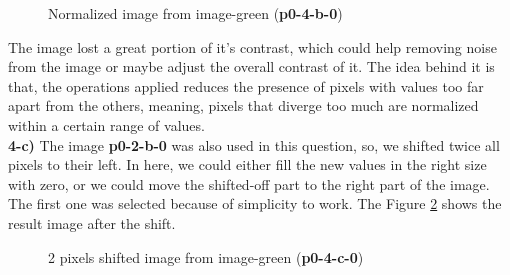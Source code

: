 \documentclass[12pt,a4paper]{article}
\begin{document}
\begin{figure}[!h]
	\centering
	{%
		\setlength{\fboxsep}{1pt}%
		\setlength{\fboxrule}{1pt}%
	}%
	\caption{Normalized image from image-green (\textbf{p0-4-b-0})}
	\label{fig:p0-4-b-0}
\end{figure}

The image lost a great portion of it's contrast, which could help removing noise from the image or maybe adjust the overall contrast of it. The idea behind it is that, the operations applied reduces the presence of pixels with values too far apart from the others, meaning, pixels that diverge too much are normalized within a certain range of values. \\


\textbf{4-c) } The image \textbf{p0-2-b-0} was also used in this question, so, we shifted twice all pixels to their left. In here, we could either fill the new values in the right size with zero, or we could move the shifted-off part to the right part of the image. The first one was selected because of simplicity to work. The Figure \ref{fig:p0-4-c-0} shows the result image after the shift.

\begin{figure}[!h]
	\centering
	{%
		\setlength{\fboxsep}{1pt}%
		\setlength{\fboxrule}{1pt}%
	}%
	\caption{2 pixels shifted image from image-green (\textbf{p0-4-c-0})}
	\label{fig:p0-4-c-0}
\end{figure}
\end{document}
